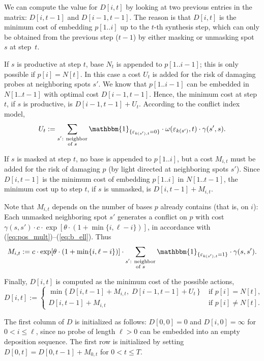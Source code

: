 \documentclass{w-edbk}
\newcommand{\eps}{\varepsilon}
\newcommand{\Ind}[1]{\mathbbm{1}_{\{{#1}\}}}
\begin{document}
We can compute the value for $D[i,t]$ by looking at two previous
entries in the matrix: $D[i,t-1]$ and $D[i-1,t-1]$. The reason is that
$D[i,t]$ is the minimum cost of embedding $p[1..i]$ up to the
$t$-th synthesis step, which can only be obtained from the previous
step ($t-1$) by either masking or unmasking spot~$s$ at step~$t$.

If $s$ is productive at step $t$, base $N_t$ is appended to
$p[1..i-1]$; this is only possible if $p[i]=N[t]$. In this case a cost
$U_t$ is added for the risk of damaging probes at neighboring spots
$s'$. We know that $p[1..i-1]$ can be embedded in $N[1..t-1]$ with
optimal cost $D[i-1,t-1]$.  Hence, the minimum cost at step $t$, if
$s$ is productive, is $D[i-1,t-1] + U_t$.  According to the conflict
index model,
\[
U_t := \sum_{\substack{s'\text{: neighbor}\\\text{of } s}}
  \Ind{\eps_{k(s'),t}=0}
  \cdot \omega(\eps_{k(s')},t)
  \cdot \gamma(s',s).
\]


If $s$ is masked at step $t$, no base is appended to $p[1..i]$, but a
cost $M_{i,t}$ must be added for the risk of damaging $p$ (by light
directed at neighboring spots $s'$). Since $D[i,t-1]$ is the minimum
cost of embedding $p[1..i]$ in $N[1..t-1]$, the minimum cost up to step
$t$, if $s$ is unmasked, is $D[i,t-1] + M_{i,t}$.

Note that $M_{i,t}$ depends on the number of bases $p$ already
contains (that is, on $i$): Each unmasked neighboring spot $s'$
generates a conflict on $p$ with cost $\gamma(s,s') \cdot c \cdot
\exp[\theta\cdot (1+\min\{i,\ell-i\})]$, in accordance with
(\ref{eq:pos_mult})--(\ref{eq:b_ell}). Thus
\[
M_{i,t} := c \cdot \exp[\theta\cdot (1+\min\{i,\ell-i\})] \cdot
\sum_{\substack{s'\text{: neighbor}\\\text{of } s}}
\Ind{\eps_{k(s'),t}=1}  \cdot \gamma(s,s').
\]

Finally, $D[i,t]$ is computed as the minimum cost of the possible
actions,
\[
D[i,t] := \begin{cases}
  \min \{\, D[i,t-1] + M_{i,t},\;  D[i-1,t-1] + U_t \,\}
  & \text{ if $p[i]=N[t]$,}\\
  D[i,t-1] + M_{i,t}
  & \text{ if $p[i]\neq N[t]$.}
  \end{cases}
\]

The first column of $D$ is initialized as follows: $D[0,0] = 0$ and
$D[i,0] = \infty$ for $0 < i \leq \ell$, since no probe of length
$\ell > 0$ can be embedded into an empty deposition sequence. The
first row is initialized by setting $D[0,t] = D[0,t-1]+M_{0,t}$ for
$0<t\leq T$.
\end{document}
